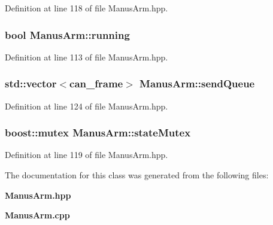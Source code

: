 \-Definition at line 118 of file \-Manus\-Arm.\-hpp.

\subsubsection[{running}]{\setlength{\rightskip}{0pt plus 5cm}bool {\bf \-Manus\-Arm\-::running}\hspace{0.3cm}{\ttfamily  [private]}}\label{classManusArm_ae75dc5af7c9c1e60bed18699f0e5bf4e}


\-Definition at line 113 of file \-Manus\-Arm.\-hpp.

\subsubsection[{send\-Queue}]{\setlength{\rightskip}{0pt plus 5cm}std\-::vector$<$can\-\_\-frame$>$ {\bf \-Manus\-Arm\-::send\-Queue}\hspace{0.3cm}{\ttfamily  [private]}}\label{classManusArm_ae2c56bb1f4f070175e891f53e89b5db2}


\-Definition at line 124 of file \-Manus\-Arm.\-hpp.

\subsubsection[{state\-Mutex}]{\setlength{\rightskip}{0pt plus 5cm}boost\-::mutex {\bf \-Manus\-Arm\-::state\-Mutex}\hspace{0.3cm}{\ttfamily  [private]}}\label{classManusArm_a5391659e5a713fc592825b8758a27edf}


\-Definition at line 119 of file \-Manus\-Arm.\-hpp.



\-The documentation for this class was generated from the following files\-:\begin{DoxyCompactItemize}
\item 
{\bf \-Manus\-Arm.\-hpp}\item 
{\bf \-Manus\-Arm.\-cpp}\end{DoxyCompactItemize}
